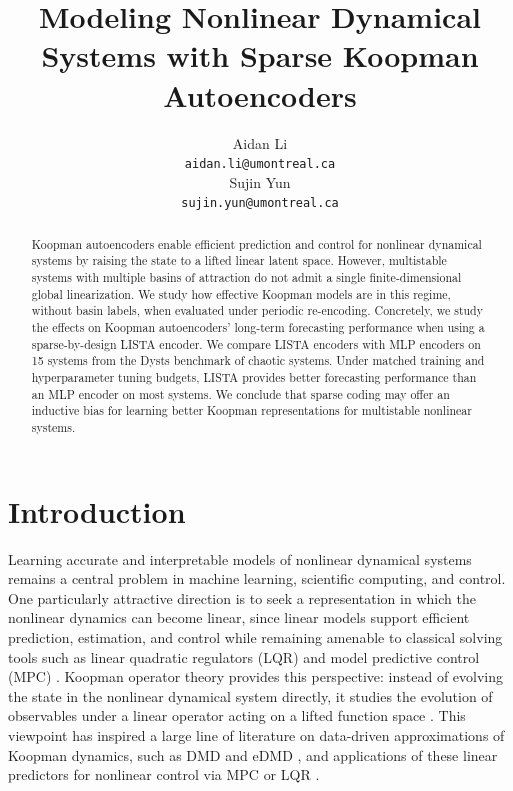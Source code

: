 \documentclass{article}
\title{Modeling Nonlinear Dynamical Systems with Sparse Koopman Autoencoders}
\author{%
  Aidan Li \\
  \texttt{aidan.li@umontreal.ca} \\
  \And
  Sujin Yun \\
  \texttt{sujin.yun@umontreal.ca} \\
}
\begin{document}
\maketitle

\begin{abstract}
    Koopman autoencoders enable efficient prediction and control for nonlinear dynamical systems by raising the state to a lifted linear latent space. However, multistable systems with multiple basins of attraction do not admit a single finite-dimensional global linearization. We study how effective Koopman models are in this regime, without basin labels, when evaluated under periodic re-encoding. 
    Concretely, we study the effects on Koopman autoencoders' long-term forecasting performance when using a sparse-by-design LISTA encoder. 
    We compare LISTA encoders with MLP encoders on 15 systems from the Dysts benchmark of chaotic systems. 
    Under matched training and hyperparameter tuning budgets, LISTA provides better forecasting performance than an MLP encoder on most systems. We conclude that sparse coding may offer an inductive bias for learning better Koopman representations for multistable nonlinear systems.
\end{abstract}

\section{Introduction}
\label{sec:introduction}

Learning accurate and interpretable models of nonlinear dynamical systems remains a central problem in machine learning, scientific computing, and control. One particularly attractive direction is to seek a representation in which the nonlinear dynamics can become linear, since linear models support efficient prediction, estimation, and control while remaining amenable to classical solving tools such as linear quadratic regulators (LQR) \citep{kalman_general_1960} and model predictive control (MPC) \citep{mayne_constrained_2000, grune_nonlinear_2017}. Koopman operator theory provides this perspective: instead of evolving the state in the nonlinear dynamical system directly, it studies the evolution of observables under a linear operator acting on a lifted function space \citep{koopman_hamiltonian_1931, koopman_dynamical_1932, brunton_modern_2022}. This viewpoint has inspired a large line of literature on data-driven approximations of Koopman dynamics, such as DMD and eDMD \citep{schmid_dmd_2010, williams_datadriven_2015, williams_kernel-based_2016}, and applications of these linear predictors for nonlinear control via MPC \citep{korda_linear_2018} or LQR \citep{mamakoukas_local_2019}.
\end{document}

